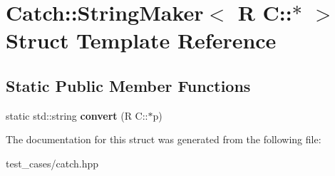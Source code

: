 \hypertarget{structCatch_1_1StringMaker_3_01R_01C_1_1_5_01_4}{}\section{Catch\+:\+:String\+Maker$<$ R C\+:\+:$\ast$ $>$ Struct Template Reference}
\label{structCatch_1_1StringMaker_3_01R_01C_1_1_5_01_4}
\subsection*{Static Public Member Functions}
\begin{DoxyCompactItemize}
\item 
\mbox{\label{structCatch_1_1StringMaker_3_01R_01C_1_1_5_01_4_af69c15e0b406e945777137fe4a333731}} 
static std\+::string {\bfseries convert} (R C\+::$\ast$p)
\end{DoxyCompactItemize}


The documentation for this struct was generated from the following file\+:\begin{DoxyCompactItemize}
\item 
test\+\_\+cases/catch.\+hpp\end{DoxyCompactItemize}

